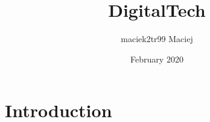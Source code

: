 \documentclass{article}
\title{DigitalTech}
\author{maciek2tr99 Maciej}
\date{February 2020}
\begin{document}
\maketitle

\section{Introduction}
\end{document}
